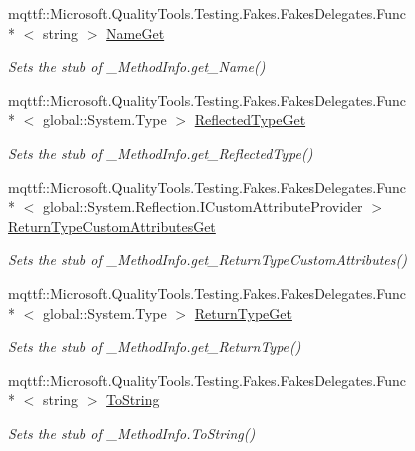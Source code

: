 \begin{DoxyCompactItemize}
mqttf\-::\-Microsoft.\-Quality\-Tools.\-Testing.\-Fakes.\-Fakes\-Delegates.\-Func\\*
$<$ string $>$ \hyperlink{class_system_1_1_runtime_1_1_interop_services_1_1_fakes_1_1_stub___method_info_a2f80c227e0f981048a01eba08b0653f2}{Name\-Get}
\begin{DoxyCompactList}\small\item\em Sets the stub of \-\_\-\-Method\-Info.\-get\-\_\-\-Name()\end{DoxyCompactList}\item 
mqttf\-::\-Microsoft.\-Quality\-Tools.\-Testing.\-Fakes.\-Fakes\-Delegates.\-Func\\*
$<$ global\-::\-System.\-Type $>$ \hyperlink{class_system_1_1_runtime_1_1_interop_services_1_1_fakes_1_1_stub___method_info_aec8647cb4dccf19c4773077149a5662b}{Reflected\-Type\-Get}
\begin{DoxyCompactList}\small\item\em Sets the stub of \-\_\-\-Method\-Info.\-get\-\_\-\-Reflected\-Type()\end{DoxyCompactList}\item 
mqttf\-::\-Microsoft.\-Quality\-Tools.\-Testing.\-Fakes.\-Fakes\-Delegates.\-Func\\*
$<$ global\-::\-System.\-Reflection.\-I\-Custom\-Attribute\-Provider $>$ \hyperlink{class_system_1_1_runtime_1_1_interop_services_1_1_fakes_1_1_stub___method_info_a9b533d538aa65c5b1a5bd3f2055610b1}{Return\-Type\-Custom\-Attributes\-Get}
\begin{DoxyCompactList}\small\item\em Sets the stub of \-\_\-\-Method\-Info.\-get\-\_\-\-Return\-Type\-Custom\-Attributes()\end{DoxyCompactList}\item 
mqttf\-::\-Microsoft.\-Quality\-Tools.\-Testing.\-Fakes.\-Fakes\-Delegates.\-Func\\*
$<$ global\-::\-System.\-Type $>$ \hyperlink{class_system_1_1_runtime_1_1_interop_services_1_1_fakes_1_1_stub___method_info_ac13c806c0ceec021a2ef52dd50a20418}{Return\-Type\-Get}
\begin{DoxyCompactList}\small\item\em Sets the stub of \-\_\-\-Method\-Info.\-get\-\_\-\-Return\-Type()\end{DoxyCompactList}\item 
mqttf\-::\-Microsoft.\-Quality\-Tools.\-Testing.\-Fakes.\-Fakes\-Delegates.\-Func\\*
$<$ string $>$ \hyperlink{class_system_1_1_runtime_1_1_interop_services_1_1_fakes_1_1_stub___method_info_ac767291d4b5854adff6fa25e6974a446}{To\-String}
\begin{DoxyCompactList}\small\item\em Sets the stub of \-\_\-\-Method\-Info.\-To\-String()\end{DoxyCompactList}\end{DoxyCompactItemize}



